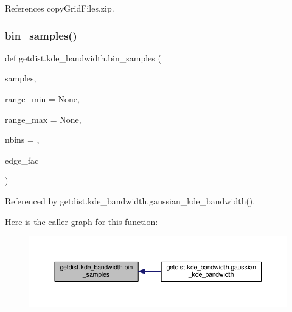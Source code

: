 References copy\+Grid\+Files.\+zip.

\mbox{\label{namespacegetdist_1_1kde__bandwidth_a1df6244e0384511be832a00924a1aabb}} 
\subsubsection{\texorpdfstring{bin\+\_\+samples()}{bin\_samples()}}
{\footnotesize\ttfamily def getdist.\+kde\+\_\+bandwidth.\+bin\+\_\+samples (\begin{DoxyParamCaption}\item[{}]{samples,  }\item[{}]{range\+\_\+min = {\ttfamily None},  }\item[{}]{range\+\_\+max = {\ttfamily None},  }\item[{}]{nbins = {},  }\item[{}]{edge\+\_\+fac = {} }\end{DoxyParamCaption})}



Referenced by getdist.\+kde\+\_\+bandwidth.\+gaussian\+\_\+kde\+\_\+bandwidth().

Here is the caller graph for this function\+:
\nopagebreak
\begin{figure}[H]
\begin{center}
\leavevmode
\includegraphics[width=350pt]{namespacegetdist_1_1kde__bandwidth_a1df6244e0384511be832a00924a1aabb_icgraph}
\end{center}
\end{figure}
\mbox{\label{namespacegetdist_1_1kde__bandwidth_a263039d35460dd02a02948f52351bd52}} 

